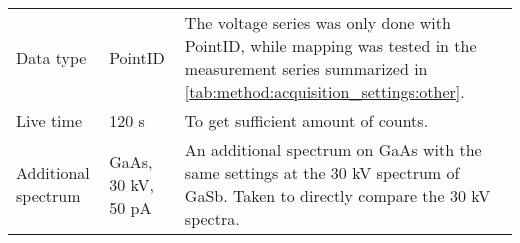 \begin{table}[htbp]
\begin{center}
\begin{tabular}{p{2cm}p{3cm}p{8.6cm}}
            Data type           & PointID              & The voltage series was only done with PointID, while mapping was tested in the measurement series summarized in \cref{tab:method:acquisition_settings:other}.                                                                                                  \\
            Live time           & 120 s                & To get sufficient amount of counts.                                                                                                                                                                                                                            \\
            Additional spectrum & GaAs, 30 kV, 50 pA   & An additional spectrum on GaAs with the same settings at the 30 kV spectrum of GaSb. Taken to directly compare the 30 kV spectra.                                                                                                                               \\

            \hline
        \end{tabular}
    \end{center}
\end{table}
